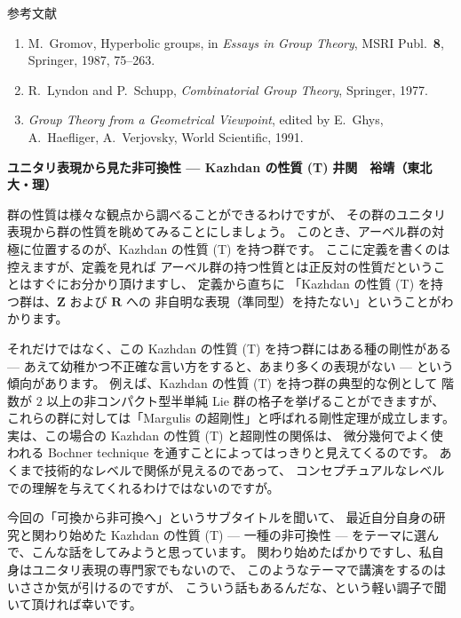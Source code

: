 \documentclass[uplatex,dvipdfmx]{jlreq}
\begin{document}
\begin{center}
  \textsc{参考文献}
\end{center}
\begin{enumerate}
  \item[{[G]}] M.~Gromov,
        Hyperbolic groups,
        in \textit{Essays in Group Theory},
        MSRI Publ.~\textbf{8}, Springer, 1987, 75--263.
  \item[{[LS]}] R.~Lyndon and P.~Schupp,
        \textit{Combinatorial Group Theory},
        Springer, 1977.
  \item[{[GHV]}] \textit{Group Theory from a Geometrical Viewpoint},
        edited by E.~Ghys, A.~Haefliger, A.~Verjovsky,
        World Scientific, 1991.
\end{enumerate}

\newpage

\noindent
{\large\bfseries ユニタリ表現から見た非可換性 --- Kazhdan の性質 (T)}
\hfill
{\large\bfseries 井関　裕靖（東北大・理）}

\bigskip

群の性質は様々な観点から調べることができるわけですが、
その群のユニタリ表現から群の性質を眺めてみることにしましょう。
このとき、アーベル群の対極に位置するのが、Kazhdan の性質 (T) を持つ群です。
ここに定義を書くのは控えますが、定義を見れば
アーベル群の持つ性質とは正反対の性質だということはすぐにお分かり頂けますし、
定義から直ちに
「Kazhdan の性質 (T) を持つ群は、$\mathbf{Z}$ および $\mathbf{R}$ への
非自明な表現（準同型）を持たない」ということがわかります。

それだけではなく、この Kazhdan の性質 (T) を持つ群にはある種の剛性がある
--- あえて幼稚かつ不正確な言い方をすると、あまり多くの表現がない ---
という傾向があります。
例えば、Kazhdan の性質 (T) を持つ群の典型的な例として
階数が $2$ 以上の非コンパクト型半単純 Lie 群の格子を挙げることができますが、
これらの群に対しては「Margulis の超剛性」と呼ばれる剛性定理が成立します。
実は、この場合の Kazhdan の性質 (T) と超剛性の関係は、
微分幾何でよく使われる Bochner technique を通すことによってはっきりと見えてくるのです。
あくまで技術的なレベルで関係が見えるのであって、
コンセプチュアルなレベルでの理解を与えてくれるわけではないのですが。

今回の「可換から非可換へ」というサブタイトルを聞いて、
最近自分自身の研究と関わり始めた Kazhdan の性質 (T)
--- 一種の非可換性 --- をテーマに選んで、こんな話をしてみようと思っています。
関わり始めたばかりですし、私自身はユニタリ表現の専門家でもないので、
このようなテーマで講演をするのはいささか気が引けるのですが、
こういう話もあるんだな、という軽い調子で聞いて頂ければ幸いです。
\end{document}

